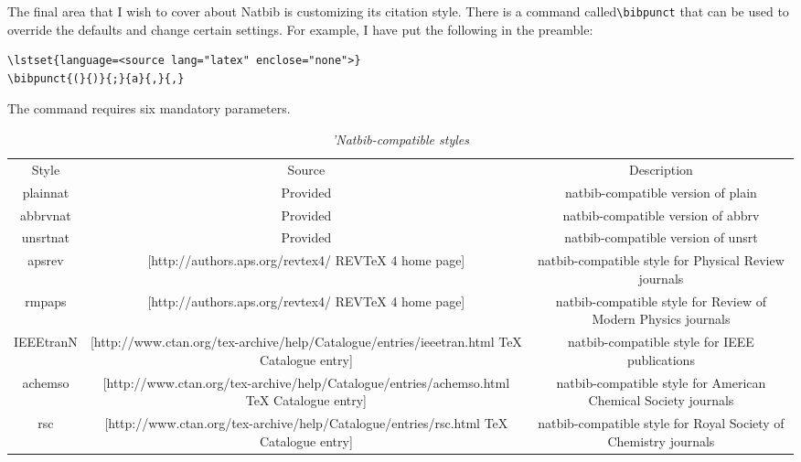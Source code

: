 The final area that I wish to cover about Natbib is customizing its citation
style. There is a command called\verb|\bibpunct| that can be used to override
the defaults and change certain settings. For example, I have put the following
in the preamble:

\begin{lstlisting}
\lstset{language=<source lang="latex" enclose="none">}
\bibpunct{(}{)}{;}{a}{,}{,}
\end{lstlisting}
The command requires six mandatory parameters.

\begin{table}
\caption{\textit{'Natbib-compatible styles}}
\begin{tabular}{c c c} \hline
\\ \hline
 Style
&  Source
&  Description
\\ \hline
 plainnat
&  Provided
&  natbib-compatible version of plain
\\ \hline
 abbrvnat
&  Provided
&  natbib-compatible version of abbrv
\\ \hline
 unsrtnat
&  Provided
&  natbib-compatible version of unsrt
\\ \hline
 apsrev
&  [http://authors.aps.org/revtex4/ REVTeX 4 home page]
&  natbib-compatible style for Physical Review journals
\\ \hline
 rmpaps
&  [http://authors.aps.org/revtex4/ REVTeX 4 home page]
&  natbib-compatible style for Review of Modern Physics journals
\\ \hline
 IEEEtranN
&  [http://www.ctan.org/tex-archive/help/Catalogue/entries/ieeetran.html TeX Catalogue entry]
&  natbib-compatible style for IEEE publications
\\ \hline
 achemso
&  [http://www.ctan.org/tex-archive/help/Catalogue/entries/achemso.html TeX Catalogue entry]
&  natbib-compatible style for American Chemical Society journals
\\ \hline
 rsc
&  [http://www.ctan.org/tex-archive/help/Catalogue/entries/rsc.html TeX Catalogue entry]
&  natbib-compatible style for Royal Society of Chemistry journals
\end{tabular}
\end{table}

